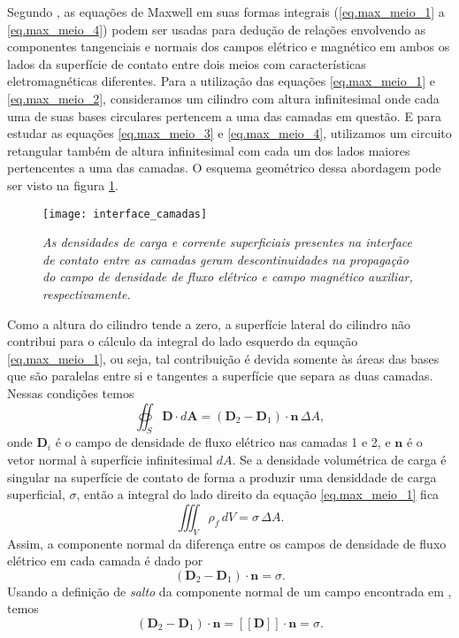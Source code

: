 Segundo \cite{jackson_classical_1999}, as equa\c{c}\~oes de Maxwell em suas formas integrais (\ref{eq.max_meio_1} a \ref{eq.max_meio_4}) podem ser usadas para dedu\c{c}\~ao de rela\c{c}\~oes envolvendo as componentes tangenciais e normais dos campos el\'etrico e magn\'etico em ambos os lados da superf\'icie de contato entre dois meios com caracter\'isticas eletromagn\'eticas diferentes. Para a utiliza\c{c}\~ao das equa\c{c}\~oes \ref{eq.max_meio_1} e \ref{eq.max_meio_2}, consideramos um cilindro com altura infinitesimal onde cada uma de suas bases circulares pertencem a uma das camadas em quest\~ao. E para estudar as equa\c{c}\~oes \ref{eq.max_meio_3} e \ref{eq.max_meio_4}, utilizamos um circuito retangular tamb\'em de altura infinitesimal com cada um dos lados maiores pertencentes a uma das camadas. O esquema geom\'etrico dessa abordagem pode ser visto na figura \ref{fig.cond_contorno}. 
\begin{figure}[!htb]
\centering
\texttt{[image: interface\_camadas]}
\caption{\textit{As densidades de carga e corrente superficiais presentes na interface de contato entre as camadas geram descontinuidades na propaga\c{c}\~ao do campo de densidade de fluxo el\'etrico e campo magn\'etico auxiliar, respectivamente.}}
\label{fig.cond_contorno}
\end{figure}
Como a altura do cilindro tende a zero, a superf\'icie lateral do cilindro n\~ao contribui para o c\'alculo da integral do lado esquerdo da equa\c{c}\~ao \ref{eq.max_meio_1}, ou seja, tal contribui\c{c}\~ao \'e devida somente \`as \'areas das bases que s\~ao paralelas entre si e tangentes a superf\'icie que separa as duas camadas. Nessas condi\c{c}\~oes temos
\begin{equation*}
\oiint_S\mathbf{D}\cdot d\mathbf{A} = (\mathbf{D}_2-\mathbf{D}_1)\cdot\mathbf{n}\,\Delta A,
\end{equation*}
onde $\mathbf{D}_i$ \'e o campo de densidade de fluxo el\'etrico nas camadas 1 e 2, e $\mathbf{n}$ \'e o vetor normal \`a superf\'icie infinitesimal $dA$. Se a densidade volum\'etrica de carga \'e singular na superf\'icie de contato de forma a produzir uma densiddade de carga superficial, $\sigma$, ent\~ao a integral do lado direito da equa\c{c}\~ao \ref{eq.max_meio_1} fica
\begin{equation*}
\iiint_V\rho_f\,dV=\sigma\,\Delta A.
\end{equation*}
Assim, a componente normal da diferen\c{c}a entre os campos de densidade de fluxo el\'etrico em cada camada \'e dado por
\begin{equation*}
(\mathbf{D}_2-\mathbf{D}_1)\cdot\mathbf{n}=\sigma. 
\end{equation*} 
Usando a defini\c{c}\~ao de \textit{salto} da componente normal de um campo encontrada em \cite{erigen_1963}, temos
\begin{equation}\label{eq.gau_meio_1}
(\mathbf{D}_2-\mathbf{D}_1)\cdot\mathbf{n}=\left[\left[\mathbf{D}\right]\right]\cdot\mathbf{n}=\sigma.
\end{equation}

